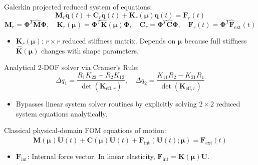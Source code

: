 \documentclass[12pt,a4paper,oneside]{report}
\newcommand{\vect}[1]{\mathbf{#1}}
\newcommand{\mat}[1]{\mathbf{#1}}
\begin{document}
Galerkin projected reduced system of equations:
\begin{equation}
    \mathbf{M}_{r} \ddot{\vect{q}}(t) + \mathbf{C}_{r} \dot{\vect{q}}(t) + \mathbf{K}_{r}(\boldsymbol{\mu}) \vect{q}(t) = \mathbf{F}_{r}(t)
\end{equation}
\begin{equation}
    \mathbf{M}_{r} = \boldsymbol{\Phi}^T \hat{\mathbf{M}} \boldsymbol{\Phi}, \quad \mathbf{K}_{r}(\boldsymbol{\mu}) = \boldsymbol{\Phi}^T \hat{\mathbf{K}}(\boldsymbol{\mu}) \boldsymbol{\Phi}, \quad \mathbf{C}_{r} = \boldsymbol{\Phi}^T \hat{\mathbf{C}} \boldsymbol{\Phi}, \quad \mathbf{F}_{r}(t) = \boldsymbol{\Phi}^T \hat{\mathbf{F}}_{\text{ext}}(t)
\end{equation}
\begin{tcolorbox}[colback=gray!5!white,colframe=gray!60!black,title={Term Definitions \& Parameter Dependencies}]
\begin{itemize}
    \item $\mathbf{K}_r(\boldsymbol{\mu})$: $r \times r$ reduced stiffness matrix. Depends on $\boldsymbol{\mu}$ because full stiffness $\hat{\mathbf{K}}(\boldsymbol{\mu})$ changes with shape parameters.
\end{itemize}
\end{tcolorbox}

Analytical 2-DOF solver via Cramer's Rule:
\begin{equation}
    \Delta q_1 = \frac{R_1 K_{22} - R_2 K_{12}}{\det(\mathbf{K}_{\text{eff}, r})}, \quad \Delta q_2 = \frac{K_{11} R_2 - K_{21} R_1}{\det(\mathbf{K}_{\text{eff}, r})}
\end{equation}
\begin{tcolorbox}[colback=gray!5!white,colframe=gray!60!black,title={Term Definitions \& Parameter Dependencies}]
\begin{itemize}
    \item Bypasses linear system solver routines by explicitly solving $2 \times 2$ reduced system equations analytically.
\end{itemize}
\end{tcolorbox}

Classical physical-domain FOM equations of motion:
\begin{equation}
\mat{M}(\boldsymbol{\mu})\ddot{\vect{U}}(t) + \mat{C}(\boldsymbol{\mu})\dot{\vect{U}}(t) + \mathbf{F}_{\text{int}}(\vect{U}(t); \boldsymbol{\mu}) = \mathbf{F}_{\text{ext}}(t)
\end{equation}
\begin{tcolorbox}[colback=gray!5!white,colframe=gray!60!black,title={Term Definitions \& Parameter Dependencies}]
\begin{itemize}
    \item $\mathbf{F}_{\text{int}}$: Internal force vector. In linear elasticity, $\mathbf{F}_{\text{int}} = \mat{K}(\boldsymbol{\mu}) \vect{U}$.
\end{itemize}
\end{tcolorbox}
\end{document}
